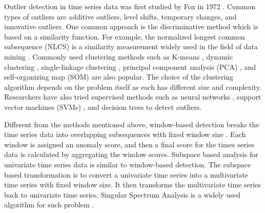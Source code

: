 Outlier detection in time series data was first studied by Fox in 1972
\cite{fox1972outliers}. Common types of outliers are additive outliers,
level shifts, temporary changes, and innovative outliers. One common
approach is the discriminative method which is based on a similarity
function. For example, the normalized longest common subsequence
(NLCS) is a similarity measurement widely used in the field of data
mining \cite{budalakoti2009anomaly, chandola2008comparative,
sequeira2002admit}. Commonly used clustering methods such as
K-means \cite{macqueen1967some}, dynamic clustering
\cite{sequeira2002admit}, single-linkage clustering
\cite{portnoy2001intrusion}, principal component analysis (PCA)
\cite{gupta2013context}, and self-organizing map (SOM)
\cite{gonzalez2003anomaly} are also popular. The choice of the
clustering algorithm depends on the problem itself as each has
different size and complexity. Researchers have also tried supervised
methods such as neural networks \cite{dasgupta2000comparison},
support vector machines (SVMs) \cite{li2006motion}, and decision
trees \cite{kang2005learning} to detect outliers.

Different from the methods mentioned above, window-based detection 
breaks the time series data into overlapping subsequences with fixed
window size \cite{cheboli2010anomaly}. Each window is assigned an
anomaly score, and then a final score for the times series data is
calculated by aggregating the window scores. Subspace based analysis for
univariate time series data is similar to window-based detection. The
subspace based transformation is to convert a univariate time series
into a multivariate time series with fixed window size. It then
transforms the multivariate time series back to univariate time series.
Singular Spectrum Analysis is a widely used algorithm for such problem
\cite{golyandina2013singular}.

